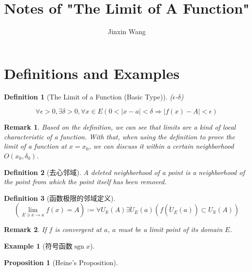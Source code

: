 \documentclass[onecolumn]{ctexart}
\title{Notes of "The Limit of A Function"}
\author{Jinxin Wang}
\date{}
\newtheorem{definition}{Definition}
\newtheorem{proposition}{Proposition}
\newtheorem{remark}{Remark}
\newtheorem{example}{Example}
\DeclareMathOperator{\sgn}{sgn}
\begin{document}
\maketitle

\section{Definitions and Examples}

\begin{definition}[The Limit of a Function (Basic Type)]
  ($\epsilon$-$\delta$)

  \begin{equation}
    \forall \epsilon > 0, \exists \delta > 0, \forall x \in E (0 < |x - a| < \delta \Rightarrow |f(x) - A| < \epsilon)
  \end{equation}
\end{definition}

\begin{remark}
  Based on the definition, we can see that limits are a kind of local 
  characteristic of a function. With that, when using the definition to prove 
  the limit of a function at $x = x_0$, we can discuss it within a certain 
  neighborhood $O(x_0, \delta_0)$.
\end{remark}

\begin{definition}[去心邻域]
  A deleted neighborhood of a point is a neighborhood of the point from which 
  the point itself has been removed.
\end{definition}

\begin{definition}[函数极限的邻域定义]
  \begin{equation}
    (\lim_{E \owns x \to a} f(x) = A) := \forall U_{\mathbb{R}}(A) \exists \dot{U}_E(a) (f(\dot{U}_E(a)) \subset U_{\mathbb{R}}(A))
  \end{equation}
\end{definition}
\begin{remark}
  If $f$ is convergent at $a$, $a$ must be a limit point of its domain $E$.
\end{remark}

\begin{example}[符号函数$\sgn x$]
  
\end{example}

\begin{proposition}[Heine's Proposition]
  
\end{proposition}
\end{document}
